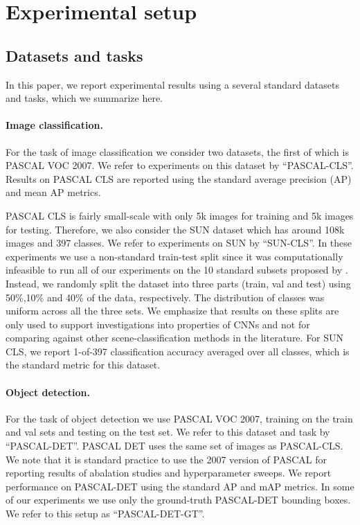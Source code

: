 \section{Experimental setup}
\label{sec:train}

\subsection{Datasets and tasks}
In this paper, we report experimental results using a several standard datasets and tasks, which we summarize here.

\paragraph{Image classification.} For the task of image classification we consider two datasets, the first of which is PASCAL VOC 2007.
We refer to experiments on this dataset by ``PASCAL-CLS''.
Results on PASCAL CLS are reported using the standard average precision (AP) and mean AP metrics.

PASCAL CLS is fairly small-scale with only 5k images for training and 5k images for testing.
Therefore, we also consider the SUN dataset \cite{sun} which has around 108k images and 397 classes.
We refer to experiments on SUN by ``SUN-CLS''.
In these experiments we use a non-standard train-test split since it was computationally infeasible to run all of our experiments on the 10 standard subsets proposed by \cite{sun}. 
Instead, we randomly split the dataset into three parts (train, val and test) using 50\%,10\% and 40\% of the data, respectively. 
The distribution of classes was uniform across all the three sets.
We emphasize that results on these splits are only used to support investigations into properties of CNNs and not for comparing against other scene-classification methods in the literature.
For SUN CLS, we report 1-of-397 classification accuracy averaged over all classes, which is the standard metric for this dataset.

\paragraph{Object detection.} For the task of object detection we use PASCAL VOC 2007, training on the train and val sets and testing on the test set. 
We refer to this dataset and task by ``PASCAL-DET''.
PASCAL DET uses the same set of images as PASCAL-CLS.
We note that it is standard practice to use the 2007 version of PASCAL for reporting results of abalation studies and hyperparameter sweeps.
We report performance on PASCAL-DET using the standard AP and mAP metrics.
In some of our experiments we use only the ground-truth PASCAL-DET bounding boxes.
We refer to this setup as ``PASCAL-DET-GT''.

